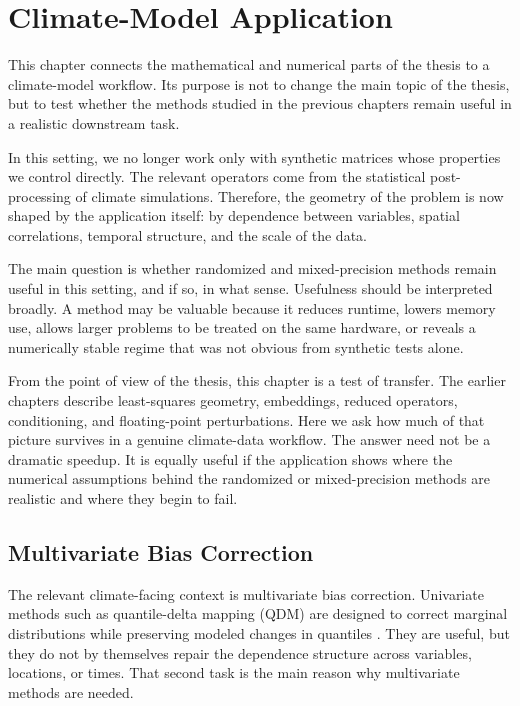 \chapter{Climate-Model Application} \label{ch:climate}

This chapter connects the mathematical and numerical parts of the thesis to a
climate-model workflow. Its purpose is not to change the main topic of the thesis,
but to test whether the methods studied in the previous chapters remain useful in a
realistic downstream task.

In this setting, we no longer work only with synthetic matrices whose properties we
control directly. The relevant operators come from the statistical post-processing
of climate simulations. Therefore, the geometry of the problem is now shaped by
the application itself: by dependence between variables, spatial correlations,
temporal structure, and the scale of the data.

The main question is whether randomized and mixed-precision methods remain
useful in this setting, and if so, in what sense. Usefulness should be interpreted
broadly. A method may be valuable because it reduces runtime, lowers memory
use, allows larger problems to be treated on the same hardware, or reveals a
numerically stable regime that was not obvious from synthetic tests alone.

From the point of view of the thesis, this chapter is a test of transfer. The earlier
chapters describe least-squares geometry, embeddings, reduced operators,
conditioning, and floating-point perturbations. Here we ask how much of that
picture survives in a genuine climate-data workflow. The answer need not be a
dramatic speedup. It is equally useful if the application shows where the numerical
assumptions behind the randomized or mixed-precision methods are realistic and
where they begin to fail.

\section{Multivariate Bias Correction}

The relevant climate-facing context is multivariate bias correction. Univariate
methods such as quantile-delta mapping (QDM) are designed to correct marginal
distributions while preserving modeled changes in quantiles
\cite{cannon2015qdm}. They are useful, but they do not by themselves repair the
dependence structure across variables, locations, or times. That second task is the
main reason why multivariate methods are needed.

